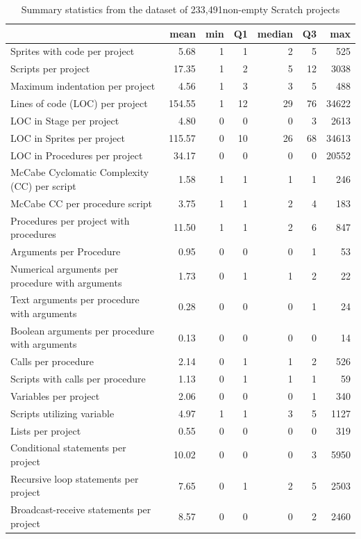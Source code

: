 \documentclass{sig-alternate}
\newcommand{\nScriptPrograms}{233,491}
\begin{document}
\begin{table}[ht]
	\centering
	\begin{tabular}{lrrrrrr}
		\hline
		&\textbf{mean}&\textbf{min}&\textbf{Q1}&\textbf{median}&\textbf{Q3}&\textbf{max}\\
		\hline
		Sprites with code per project&5.68&1&1&2&5&525\\
		Scripts per project&17.35&1&2&5&12&3038\\
		Maximum indentation per project&4.56&1&3&3&5&488\\
		Lines of code (LOC) per project&154.55&1&12&29&76&34622\\
		LOC in Stage per project&4.80&0&0&0&3&2613\\
		LOC in Sprites per project&115.57&0&10&26&68&34613\\
		LOC in Procedures per project&34.17&0&0&0&0&20552\\
		McCabe Cyclomatic Complexity (CC) per script&1.58&1&1&1&1&246\\
		McCabe CC per procedure script&3.75&1&1&2&4&183\\
		Procedures per project with procedures&11.50&1&1&2&6&847\\
		Arguments per Procedure&0.95&0&0&0&1&53\\
		Numerical arguments per procedure with arguments&1.73&0&1&1&2&22\\
		Text arguments per procedure with arguments&0.28&0&0&0&1&24\\
		Boolean arguments per procedure with arguments&0.13&0&0&0&0&14\\
		Calls per procedure&2.14&0&1&1&2&526\\
		Scripts with calls per procedure&1.13&0&1&1&1&59\\
		Variables per project&2.06&0&0&0&1&340\\
		Scripts utilizing variable&4.97&1&1&3&5&1127\\
		Lists per project&0.55&0&0&0&0&319\\
		Conditional statements per project&10.02&0&0&0&3&5950\\
		Recursive loop statements per project&7.65&0&1&2&5&2503\\
		Broadcast-receive statements per project&8.57&0&0&0&2&2460\\	
		\hline
	\end{tabular}
	\caption{Summary statistics from the dataset of \nScriptPrograms  non-empty Scratch projects}
	\label{tbl-size}
\end{table}
\end{document}
